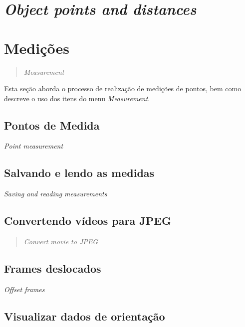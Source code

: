 \documentclass[
  12pt,
  letterpaper,
  DIV=11,
  numbers=noendperiod]{scrreprt}
\begin{document}
\section{\texorpdfstring{\emph{Object points and
distances}}{Object points and distances}}\label{object-points-and-distances}

\section{Medições}\label{mediuxe7uxf5es-1}

\begin{quote}
\emph{Measurement}
\end{quote}

Esta seção aborda o processo de realização de medições de pontos, bem
como descreve o uso dos itens do menu \emph{Measurement}.

\subsection{Pontos de Medida}\label{sec-pontos-medida}

\emph{Point measurement}

\subsection{Salvando e lendo as
medidas}\label{salvando-e-lendo-as-medidas}

\emph{Saving and reading measurements}

\subsection{Convertendo vídeos para
JPEG}\label{convertendo-vuxeddeos-para-jpeg}

\begin{quote}
\emph{Convert movie to JPEG}
\end{quote}

\subsection{Frames deslocados}\label{frames-deslocados}

\emph{Offset frames}

\subsection{Visualizar dados de
orientação}\label{visualizar-dados-de-orientauxe7uxe3o}
\end{document}
